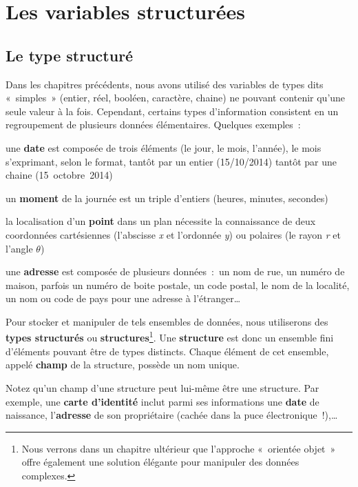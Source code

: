 \chapter{Les variables structurées}

\section{Le type structuré}

	Dans les chapitres précédents, nous avons utilisé des variables de types
	dits «~simples~» (entier, réel, booléen, caractère, chaine) ne pouvant
	contenir qu’une seule valeur à la fois. Cependant, certains types
	d’information consistent en un regroupement de plusieurs données
	élémentaires. Quelques exemples~:

	\begin{liste}
	\item {
		une \textbf{date} est composée de trois éléments (le jour, le mois,
		l’année), le mois s’exprimant, selon le format,
		tantôt par un entier (15/10/2014) tantôt
		par une chaine (15~octobre~2014)}
	\item {
		un \textbf{moment} de la journée est un triple d’entiers (heures,
		minutes, secondes)}
	\item {
		la localisation d’un \textbf{point} dans un plan nécessite la
		connaissance de deux coordonnées cartésiennes (l’abscisse \textit{x} et
		l’ordonnée \textit{y}) ou polaires (le rayon \textit{r} et l’angle
		\textit{$\theta$})}
	\item {
		une \textbf{adresse} est composée de plusieurs données~:~un nom de rue,
		un numéro de maison, parfois un numéro de boite postale, un code
		postal, le nom de la localité, un nom ou code de pays pour une adresse
		à l’étranger\dots}
	\end{liste}

	Pour stocker et manipuler de tels ensembles de données, nous utiliserons
	des \textbf{types structurés} ou \textbf{structures}\footnote{Nous
	verrons dans un chapitre ultérieur que l’approche
	«~orientée objet~» offre également une solution élégante pour manipuler
	des données complexes.}. Une \textbf{structure} est donc un ensemble
	fini d’éléments pouvant être de types distincts. Chaque élément de cet
	ensemble, appelé \textbf{champ} de la structure, possède un nom unique.
	
	Notez qu’un champ d’une structure peut lui-même être une structure. Par
	exemple, une \textbf{carte d’identité} inclut parmi ses informations
	une \textbf{date} de naissance, l’\textbf{adresse} de son
	propriétaire (cachée dans la puce électronique~!),\dots

